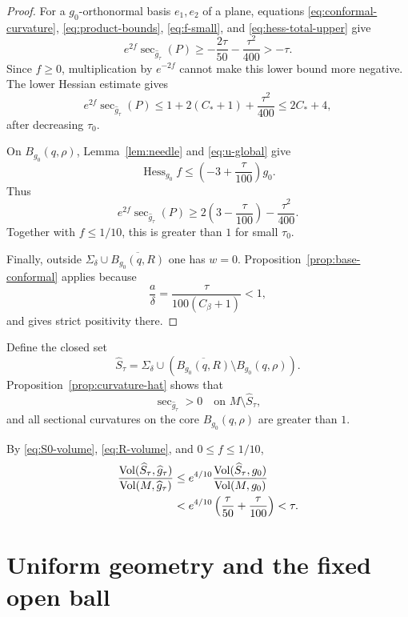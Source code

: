 \documentclass[11pt]{amsart}
\theoremstyle{definition}
\newcommand{\Vol}{\operatorname{Vol}}
\newcommand{\Hess}{\operatorname{Hess}}
\begin{document}
\begin{proof}
For a $g_0$-orthonormal basis $e_1,e_2$ of a plane, equations
\eqref{eq:conformal-curvature}, \eqref{eq:product-bounds},
\eqref{eq:f-small}, and \eqref{eq:hess-total-upper} give
\[
 e^{2f}\sec_{\widehat g_\tau}(P)
 \ge-\frac{2\tau}{50}-\frac{\tau^2}{400}>-\tau.
\]
Since $f\ge0$, multiplication by $e^{-2f}$ cannot make this lower bound more negative.  The lower Hessian estimate gives
\[
 e^{2f}\sec_{\widehat g_\tau}(P)
 \le1+2(C_*+1)+\frac{\tau^2}{400}
 \le2C_*+4,
\]
after decreasing $\tau_0$.

On $B_{g_0}(q,\rho)$, Lemma~\ref{lem:needle} and
\eqref{eq:u-global} give
\[
 \Hess_{g_0}f
 \le\left(-3+\frac{\tau}{100}\right)g_0.
\]
Thus
\[
 e^{2f}\sec_{\widehat g_\tau}(P)
 \ge 2\left(3-\frac{\tau}{100}\right)-\frac{\tau^2}{400}.
\]
Together with $f\le1/10$, this is greater than $1$ for small
$\tau_0$.

Finally, outside $\Sigma_\delta\cup\overline{B_{g_0}(q,R)}$ one has
$w=0$.  Proposition~\ref{prop:base-conformal} applies because
\[
 \frac a\delta=\frac{\tau}{100(C_\beta+1)}<1,
\]
and gives strict positivity there.
\end{proof}

Define the closed set
\begin{equation}\label{eq:Shat}
 \widehat S_\tau
 =\Sigma_\delta\cup
 \left(\overline{B_{g_0}(q,R)}\setminus B_{g_0}(q,\rho)\right).
\end{equation}
Proposition~\ref{prop:curvature-hat} shows that
\begin{equation}\label{eq:positive-away-hat}
 \sec_{\widehat g_\tau}>0
 \quad\text{on }M\setminus\widehat S_\tau,
\end{equation}
and all sectional curvatures on the core $B_{g_0}(q,\rho)$ are greater than $1$.

By \eqref{eq:S0-volume}, \eqref{eq:R-volume}, and
$0\le f\le1/10$,
\begin{align}
 \frac{\Vol(\widehat S_\tau,\widehat g_\tau)}
      {\Vol(M,\widehat g_\tau)}
 &\le e^{4/10}
 \frac{\Vol(\widehat S_\tau,g_0)}{\Vol(M,g_0)}\notag\\
 &<e^{4/10}\left(\frac{\tau}{50}+\frac{\tau}{100}\right)
 <\tau.\label{eq:relative-volume-hat}
\end{align}

\section{Uniform geometry and the fixed open ball}
\end{document}
